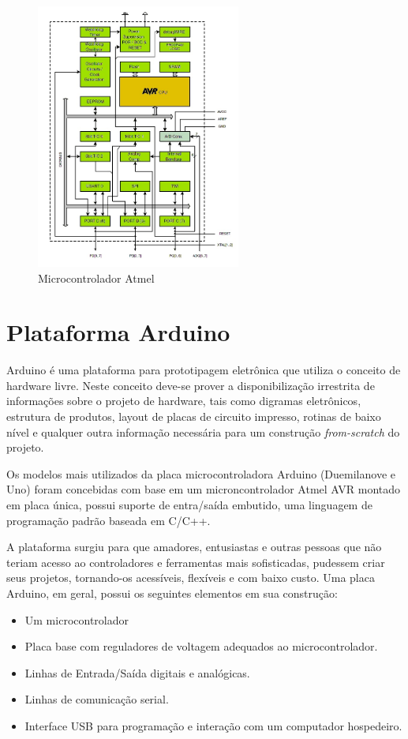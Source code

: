 \begin{figure}[h!]
			\centering
			\includegraphics[width=0.6\textwidth]{figures/microcont_atm.jpg}
			\caption{Microcontrolador Atmel}
			\label{fig:atmegabloc}
	\end{figure}

\newpage
\section{Plataforma Arduino}

Arduino é uma plataforma para prototipagem eletrônica que utiliza o conceito de hardware livre. Neste conceito deve-se prover a disponibilização irrestrita de informações sobre o projeto de hardware, tais como digramas eletrônicos, estrutura de produtos, layout de placas de circuito impresso, rotinas de baixo nível e qualquer outra informação necessária para um construção \textit{from-scratch} do projeto.

Os modelos mais utilizados da placa microcontroladora Arduino (Duemilanove e Uno) foram concebidas com base em um microncontrolador Atmel AVR montado em placa única, possui suporte de entra/saída embutido, uma linguagem de programação padrão baseada em C/C++.

A plataforma surgiu para que amadores, entusiastas e outras pessoas que não teriam acesso ao controladores e ferramentas mais sofisticadas, pudessem criar seus projetos, tornando-os acessíveis, flexíveis e com baixo custo. Uma placa Arduino, em geral, possui os seguintes elementos em sua construção:

\begin{itemize}
	\item Um microcontrolador
	\item Placa base com reguladores de voltagem adequados ao microcontrolador.
	\item Linhas de Entrada/Saída digitais e analógicas.
	\item Linhas de comunicação serial.
	\item Interface USB para programação e interação com um computador hospedeiro.
\end{itemize} 

